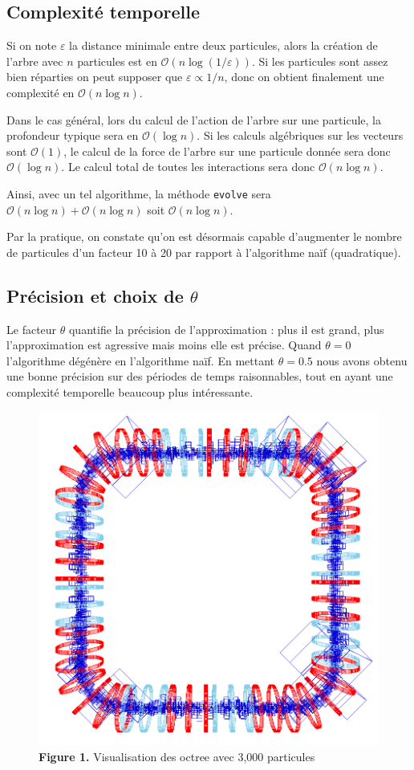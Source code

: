 \documentclass[12pt, letterpaper, twoside]{article}
\newcommand{\T}[1]{\texttt{#1}}
\def\O{\mathcal{O}}
\def\epsilon{\varepsilon}
\begin{document}
\subsection*{Complexité temporelle}
Si on note $\epsilon$ la distance minimale entre deux particules, alors la création de l'arbre avec $n$ particules est en $\O(n \log(1/\epsilon))$. Si les particules sont assez bien réparties on peut supposer que $\epsilon \propto 1/n$, donc on obtient finalement une complexité en $\O(n \log n)$.

Dans le cas général, lors du calcul de l'action de l'arbre sur une particule, la profondeur typique sera en $\O(\log n)$. Si les calculs algébriques sur les vecteurs sont $\O(1)$, le calcul de la force de l'arbre sur une particule donnée sera donc $\O(\log n)$. Le calcul total de toutes les interactions sera donc $\O(n \log n)$.

Ainsi, avec un tel algorithme, la méthode \T{evolve} sera $\O(n \log n) + \O(n \log n)$ soit $\O(n \log n)$.

Par la pratique, on constate qu'on est désormais capable d'augmenter le nombre de particules d'un facteur 10 à 20 par rapport à l'algorithme naïf (quadratique).

\subsection*{Précision et choix de $\theta$}
Le facteur $\theta$ quantifie la précision de l'approximation : plus il est grand, plus l'approximation est agressive mais moins elle est précise. Quand $\theta = 0$ l'algorithme dégénère en l'algorithme naïf. En mettant $\theta = 0.5$ nous avons obtenu une bonne précision sur des périodes de temps raisonnables, tout en ayant une complexité temporelle beaucoup plus intéressante.

\begin{figure}
	\centering
	\includegraphics[width=5in]{images/octree.png}
	\caption{\textbf{Figure 1.} Visualisation des octree avec 3,000 particules}
\end{figure}
\end{document}
